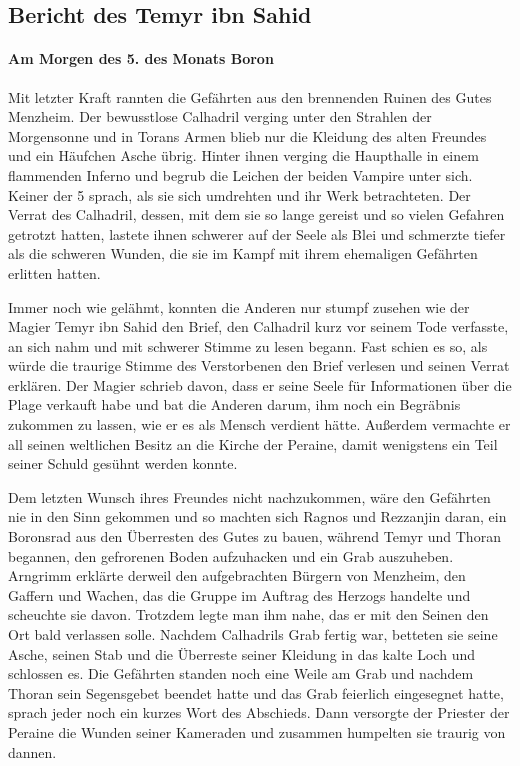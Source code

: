 \subsection{Bericht des Temyr ibn Sahid}

\paragraph{Am Morgen des 5. des Monats Boron}
Mit letzter Kraft rannten die Gefährten aus den brennenden Ruinen des Gutes Menzheim. Der bewusstlose Calhadril verging unter den Strahlen der Morgensonne und in Torans Armen blieb nur die Kleidung des alten Freundes und ein Häufchen Asche übrig. Hinter ihnen verging die Haupthalle in einem flammenden Inferno und begrub die Leichen der beiden Vampire unter sich. Keiner der 5 sprach, als sie sich umdrehten und ihr Werk betrachteten. Der Verrat des Calhadril, dessen, mit dem sie so lange gereist und so vielen Gefahren getrotzt hatten, lastete ihnen schwerer auf der Seele als Blei und schmerzte tiefer als die schweren Wunden, die sie im Kampf mit ihrem ehemaligen Gefährten erlitten hatten.\par
Immer noch wie gelähmt, konnten die Anderen nur stumpf zusehen wie der Magier Temyr ibn Sahid den Brief, den Calhadril kurz vor seinem Tode verfasste, an sich nahm und mit schwerer Stimme zu lesen begann. Fast schien es so, als würde die traurige Stimme des Verstorbenen den Brief verlesen und seinen Verrat erklären. Der Magier schrieb davon, dass er seine Seele für Informationen über die Plage verkauft habe und bat die Anderen darum, ihm noch ein Begräbnis zukommen zu lassen, wie er es als Mensch verdient hätte. Außerdem vermachte er all seinen weltlichen Besitz an die Kirche der Peraine, damit wenigstens ein Teil seiner Schuld gesühnt werden konnte.\par
Dem letzten Wunsch ihres Freundes nicht nachzukommen, wäre den Gefährten nie in den Sinn gekommen und so machten sich Ragnos und Rezzanjin daran, ein Boronsrad aus den Überresten des Gutes zu bauen, während Temyr und Thoran begannen, den gefrorenen Boden aufzuhacken und ein Grab auszuheben. Arngrimm erklärte derweil den aufgebrachten Bürgern von Menzheim, den Gaffern und Wachen, das die Gruppe im Auftrag des Herzogs handelte und scheuchte sie davon. Trotzdem legte man ihm nahe, das er mit den Seinen den Ort bald verlassen solle. Nachdem Calhadrils Grab fertig war, betteten sie seine Asche, seinen Stab und die Überreste seiner Kleidung in das kalte Loch und schlossen es. Die Gefährten standen noch eine Weile am Grab und nachdem Thoran sein Segensgebet beendet hatte und das Grab feierlich eingesegnet hatte, sprach jeder noch ein kurzes Wort des Abschieds. Dann versorgte der Priester der Peraine die Wunden seiner Kameraden und zusammen humpelten sie traurig von dannen.\par
